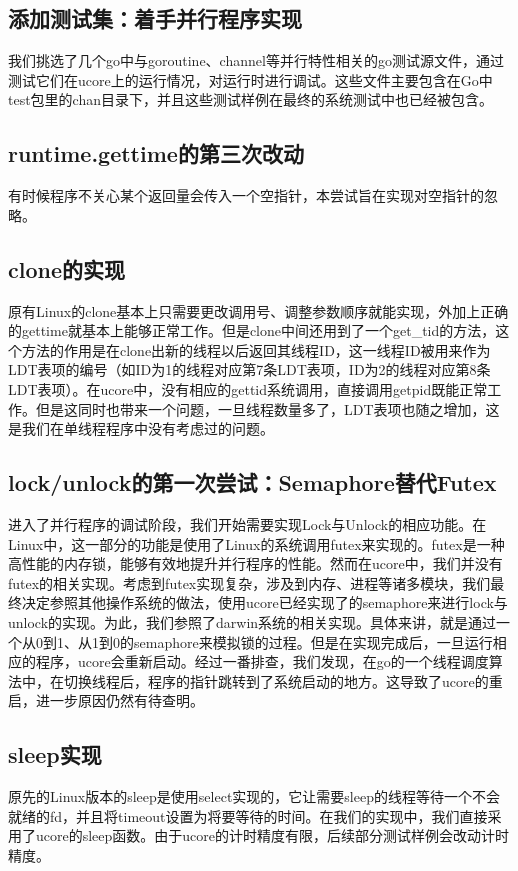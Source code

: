 \documentclass{article}
\begin{document}
\subsection{添加测试集：着手并行程序实现}
我们挑选了几个go中与goroutine、channel等并行特性相关的go测试源文件，通过测试它们在ucore上的运行情况，对运行时进行调试。这些文件主要包含在Go中test包里的chan目录下，并且这些测试样例在最终的系统测试中也已经被包含。

\subsection{runtime.gettime的第三次改动}
有时候程序不关心某个返回量会传入一个空指针，本尝试旨在实现对空指针的忽略。

\subsection{clone的实现}
原有Linux的clone基本上只需要更改调用号、调整参数顺序就能实现，外加上正确的gettime就基本上能够正常工作。但是clone中间还用到了一个get\_tid的方法，这个方法的作用是在clone出新的线程以后返回其线程ID，这一线程ID被用来作为LDT表项的编号（如ID为1的线程对应第7条LDT表项，ID为2的线程对应第8条LDT表项）。在ucore中，没有相应的gettid系统调用，直接调用getpid既能正常工作。但是这同时也带来一个问题，一旦线程数量多了，LDT表项也随之增加，这是我们在单线程程序中没有考虑过的问题。

\subsection{lock/unlock的第一次尝试：Semaphore替代Futex}
进入了并行程序的调试阶段，我们开始需要实现Lock与Unlock的相应功能。在Linux中，这一部分的功能是使用了Linux的系统调用futex来实现的。futex是一种高性能的内存锁，能够有效地提升并行程序的性能。然而在ucore中，我们并没有futex的相关实现。考虑到futex实现复杂，涉及到内存、进程等诸多模块，我们最终决定参照其他操作系统的做法，使用ucore已经实现了的semaphore来进行lock与unlock的实现。为此，我们参照了darwin系统的相关实现。具体来讲，就是通过一个从0到1、从1到0的semaphore来模拟锁的过程。但是在实现完成后，一旦运行相应的程序，ucore会重新启动。经过一番排查，我们发现，在go的一个线程调度算法中，在切换线程后，程序的指针跳转到了系统启动的地方。这导致了ucore的重启，进一步原因仍然有待查明。

\subsection{sleep实现}
原先的Linux版本的sleep是使用select实现的，它让需要sleep的线程等待一个不会就绪的fd，并且将timeout设置为将要等待的时间。在我们的实现中，我们直接采用了ucore的sleep函数。由于ucore的计时精度有限，后续部分测试样例会改动计时精度。
\end{document}
